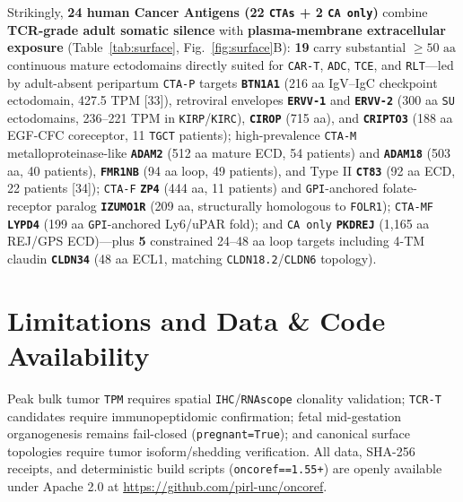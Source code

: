 \documentclass[10pt,letterpaper]{article}
\begin{document}
Strikingly, \textbf{24 human Cancer Antigens (22 \texttt{CTAs} + 2 \texttt{CA only})} combine \textbf{TCR-grade adult somatic silence} with \textbf{plasma-membrane extracellular exposure} (Table~\ref{tab:surface}, Fig.~\ref{fig:surface}B): \textbf{19} carry substantial $\ge 50\text{ aa}$ continuous mature ectodomains directly suited for \texttt{CAR-T}, \texttt{ADC}, \texttt{TCE}, and \texttt{RLT}---led by adult-absent peripartum \texttt{CTA-P} targets \textbf{\texttt{BTN1A1}} (216 aa IgV--IgC checkpoint ectodomain, 427.5 TPM [33]), retroviral envelopes \textbf{\texttt{ERVV-1}} and \textbf{\texttt{ERVV-2}} (300 aa \texttt{SU} ectodomains, 236--221 TPM in \texttt{KIRP}/\texttt{KIRC}), \textbf{\texttt{CIROP}} (715 aa), and \textbf{\texttt{CRIPTO3}} (188 aa EGF-CFC coreceptor, 11 \texttt{TGCT} patients); high-prevalence \texttt{CTA-M} metalloproteinase-like \textbf{\texttt{ADAM2}} (512 aa mature ECD, 54 patients) and \textbf{\texttt{ADAM18}} (503 aa, 40 patients), \textbf{\texttt{FMR1NB}} (94 aa loop, 49 patients), and Type II \textbf{\texttt{CT83}} (92 aa ECD, 22 patients [34]); \texttt{CTA-F} \textbf{\texttt{ZP4}} (444 aa, 11 patients) and \texttt{GPI}-anchored folate-receptor paralog \textbf{\texttt{IZUMO1R}} (209 aa, structurally homologous to \texttt{FOLR1}); \texttt{CTA-MF} \textbf{\texttt{LYPD4}} (199 aa \texttt{GPI}-anchored Ly6/uPAR fold); and \texttt{CA only} \textbf{\texttt{PKDREJ}} (1,165 aa REJ/GPS ECD)---plus \textbf{5} constrained 24--48 aa loop targets including 4-TM claudin \textbf{\texttt{CLDN34}} (48 aa ECL1, matching \texttt{CLDN18.2}/\texttt{CLDN6} topology).

\section{Limitations and Data \& Code Availability}
Peak bulk tumor \texttt{TPM} requires spatial \texttt{IHC}/\texttt{RNAscope} clonality validation; \texttt{TCR-T} candidates require immunopeptidomic confirmation; fetal mid-gestation organogenesis remains fail-closed (\texttt{pregnant=True}); and canonical surface topologies require tumor isoform/shedding verification. All data, SHA-256 receipts, and deterministic build scripts (\texttt{oncoref==1.55+}) are openly available under Apache 2.0 at \url{https://github.com/pirl-unc/oncoref}.
\end{document}
